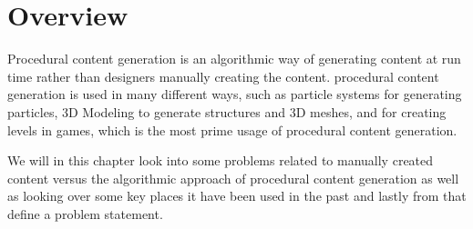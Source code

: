 \chapter{Overview}

Procedural content generation is an algorithmic way of generating content at run time rather than designers manually creating the content. procedural content generation is used in many different ways, such as particle systems for generating particles, 3D Modeling to generate structures and 3D meshes, and for creating levels in games, which is the most prime usage of procedural content generation.

We will in this chapter look into some problems related to manually created content versus the algorithmic approach of procedural content generation as well as looking over some key places it have been used in the past and lastly from that define a problem statement.